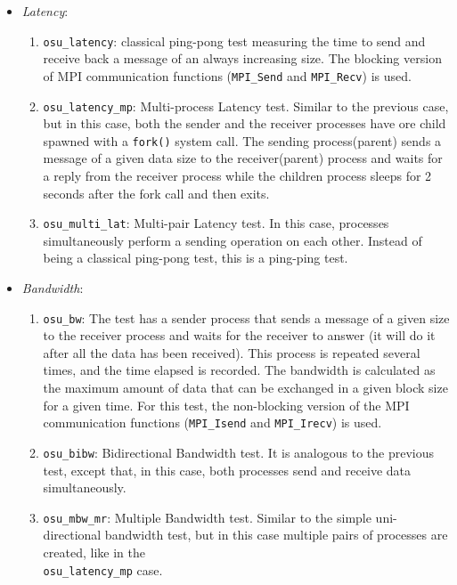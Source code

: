 \begin{itemize}
\itemsep0em
\item \textit{Latency}:
  \begin{enumerate}
    \itemsep0em
    \item \texttt{osu\_latency}: classical ping-pong test measuring the time to
      send and receive back a message of an always increasing size. The blocking
      version of MPI communication functions (\texttt{MPI\_Send} and
      \texttt{MPI\_Recv}) is used.
    \item \texttt{osu\_latency\_mp}: Multi-process Latency test. Similar to the
      previous case, but in this case, both the sender and the receiver
      processes have ore child spawned with a \texttt{fork()} system call. The
      sending process(parent) sends a message of a given data size to the
      receiver(parent) process and waits for a reply from the receiver process
      while the children process sleeps for 2 seconds after the fork call and
      then exits.
    \item \texttt{osu\_multi\_lat}: Multi-pair Latency test. In this case,
      processes simultaneously perform a sending operation on each other.
      Instead of being a classical ping-pong test, this is a ping-ping test.
  \end{enumerate}
\item \textit{Bandwidth}:
  \begin{enumerate}
    \itemsep0em
    \item \texttt{osu\_bw}: The test has a sender process that sends a message of
      a given size to the receiver process and waits for the receiver to answer
      (it will do it after all the data has been received).
      This process is repeated several times, and the time elapsed is recorded.
      The bandwidth is calculated as the maximum amount of data that can be
      exchanged in a given block size for a given time.
      For this test, the non-blocking version of the MPI communication functions
      (\texttt{MPI\_Isend} and \texttt{MPI\_Irecv}) is used.
    \item \texttt{osu\_bibw}: Bidirectional Bandwidth test. It is analogous to the
      previous test, except that, in this case, both processes send and receive
      data simultaneously.
    \item \texttt{osu\_mbw\_mr}: Multiple Bandwidth test. Similar to the simple
      uni-directional bandwidth test, but in this case multiple pairs of
      processes are created, like in the \\ \texttt{osu\_latency\_mp} case.
  \end{enumerate}
\end{itemize}


